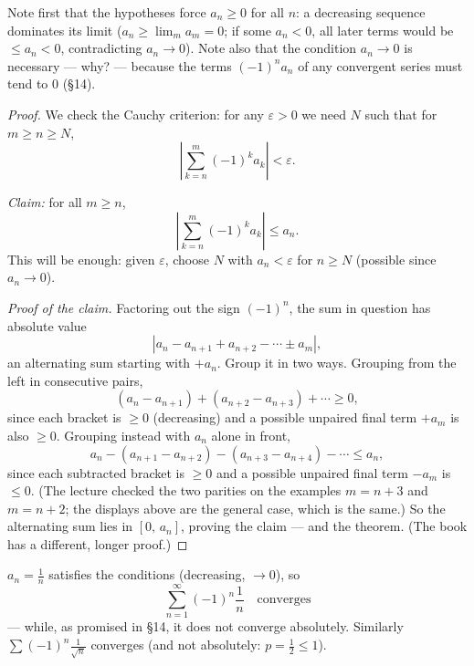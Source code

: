 \documentclass[11pt]{report}
\begin{document}
\begin{rembox}
Note first that the hypotheses force $a_n \geq 0$ for all $n$: a decreasing sequence dominates its limit ($a_n \geq \lim_m a_m = 0$; if some $a_n < 0$, all later terms would be $\leq a_n < 0$, contradicting $a_n \to 0$). Note also that the condition $a_n \to 0$ is necessary --- why? --- because the terms $(-1)^n a_n$ of any convergent series must tend to $0$ (\S 14).
\end{rembox}

\begin{proof}
We check the Cauchy criterion: for any $\varepsilon > 0$ we need $N$ such that for $m \geq n \geq N$,
\[
\left| \sum_{k=n}^{m} (-1)^k a_k \right| < \varepsilon.
\]

\emph{Claim:} for all $m \geq n$,
\[
\left| \sum_{k=n}^{m} (-1)^k a_k \right| \leq a_n.
\]
This will be enough: given $\varepsilon$, choose $N$ with $a_n < \varepsilon$ for $n \geq N$ (possible since $a_n \to 0$).

\emph{Proof of the claim.} Factoring out the sign $(-1)^n$, the sum in question has absolute value
\[
\left| a_n - a_{n+1} + a_{n+2} - \cdots \pm a_m \right|,
\]
an alternating sum starting with $+a_n$. Group it in two ways. Grouping from the left in consecutive pairs,
\[
(a_n - a_{n+1}) + (a_{n+2} - a_{n+3}) + \cdots \geq 0,
\]
since each bracket is $\geq 0$ (decreasing) and a possible unpaired final term $+a_m$ is also $\geq 0$. Grouping instead with $a_n$ alone in front,
\[
a_n - (a_{n+1} - a_{n+2}) - (a_{n+3} - a_{n+4}) - \cdots \leq a_n,
\]
since each subtracted bracket is $\geq 0$ and a possible unpaired final term $-a_m$ is $\leq 0$. (The lecture checked the two parities on the examples $m = n+3$ and $m = n+2$; the displays above are the general case, which is the same.) So the alternating sum lies in $[0,\, a_n]$, proving the claim --- and the theorem. (The book has a different, longer proof.)
\end{proof}

\begin{exbox}
$a_n = \tfrac1n$ satisfies the conditions (decreasing, $\to 0$), so
\[
\sum_{n=1}^{\infty} (-1)^n \frac1n \quad \text{converges}
\]
--- while, as promised in \S 14, it does not converge absolutely. Similarly $\sum (-1)^n \tfrac{1}{\sqrt n}$ converges (and not absolutely: $p = \tfrac12 \leq 1$).
\end{exbox}
\end{document}
